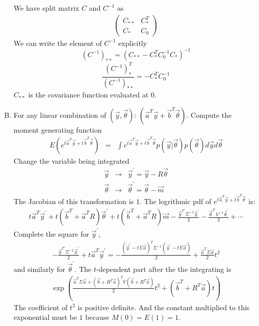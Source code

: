 \documentclass{article}
\begin{document}
\begin{enumerate}[(A)]
We have split matrix $C$ and $C^{-1}$ as
\begin{eqnarray}
\left( \begin{array}{cc}
C_{**} & C_*^T \\
C_* & C_0  \end{array} \right)
\end{eqnarray}
We can write the element of $C^{-1}$ explicitly
\[
(C^{-1})_{**}=(C_{**}-C_*^TC_0^{-1}C_*)^{-1}
\]
\[
\frac{(C^{-1})_*^T}{(C^{-1})_{**}}=-C_*^TC^{-1}_0
\]
$C_{**}$ is the covariance function evaluated at 0.
\item
For any linear combination of $(\vec{y},\vec{\theta})$: $(\vec{a}^T\vec{y}+\vec{b}^T\vec{\theta})$. Compute the moment generating function
\begin{eqnarray}
E(e^{t\vec{a}^T\vec{y}+t\vec{b}^T\vec{\theta}})&=&\int e^{t\vec{a}^T\vec{y}+t\vec{b}^T\vec{\theta}}p(\vec{y}|\vec{\theta})p(\vec{\theta})d\vec{y}d\vec{\theta}
\end{eqnarray}
Change the variable being integrated 
\begin{eqnarray}
\vec{y}&\rightarrow&\vec{y}^\prime=\vec{y}-R\vec{\theta}\\
\vec{\theta}&\rightarrow&\vec{\theta}^\prime=\vec{\theta}-\vec{m}
\end{eqnarray}
The Jacobian of this transformation is $1$. The logrithmic pdf of $e^{t\vec{a}^T\vec{y}+t\vec{b}^T\vec{\theta}}$ is:
\begin{eqnarray}
t\vec{a}^T\vec{y}^\prime+t(\vec{b}^T+\vec{a}^TR)\vec{\theta}^\prime+t(\vec{b}^T+\vec{a}^TR)\vec{m}-\frac{\vec{y}^{T\prime}\Sigma^{-1}\vec{y}^\prime}{2}-\frac{\vec{\theta}^{T\prime}V^{-1}\vec{\theta}^\prime}{2}+\cdots
\end{eqnarray}
Complete the square for $\vec{y}^\prime$,
\begin{eqnarray}
-\frac{\vec{y}^{T\prime}\Sigma^{-1}\vec{y}^\prime}{2}+t\vec{a}^T\vec{y}^\prime=-\frac{(\vec{y}^\prime-t\Sigma\vec{a})^T\Sigma^{-1}(\vec{y}^\prime-t\Sigma\vec{a})}{2}+\frac{\vec{a}^T\Sigma\vec{a}}{2}t^2
\end{eqnarray}
and similarly for $\vec{\theta}^\prime$. The $t$-dependent part after the the integrating is
\begin{eqnarray}
\exp\left(\frac{\vec{a}^T\Sigma\vec{a}+(\vec{b}+R^T\vec{a})^TV(\vec{b}+R^T\vec{a})}{2}t^2+(\vec{b}^T+R^T\vec{a})t\right)
\end{eqnarray}
The coefficient of $t^2$ is positive definite. And the constant multiplied to this exponential must be $1$ because $M(0)=E(1)=1$.
\end{enumerate}
\end{document}
